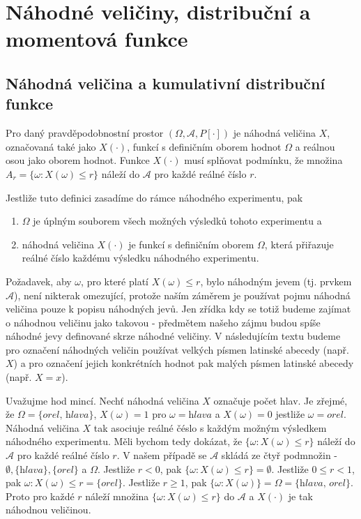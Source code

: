 \chapter{Náhodné veličiny, distribuční a momentová funkce}

\section{Náhodná veličina a kumulativní distribuční funkce}

\begin{definition}
Pro daný pravděpodobnostní prostor $(\Omega, \mathscr{A}, P[\cdot])$ je náhodná veličina $X$, označovaná také jako $X(\cdot)$, funkcí s definičním oborem hodnot $\Omega$ a reálnou osou jako oborem hodnot. Funkce $X(\cdot)$ musí splňovat podmínku, že množina $A_r = \{\omega: X(\omega) \le r\}$ náleží do $\mathscr{A}$ pro každé reálné číslo $r$.
\end{definition}
Jestliže tuto definici zasadíme do rámce náhodného experimentu, pak
\begin{enumerate}
\item $\Omega$ je úplným souborem všech možných výsledků tohoto experimentu a
\item náhodná veličina $X(\cdot)$ je funkcí s definičním oborem $\Omega$, která přiřazuje reálné číslo každému výsledku náhodného experimentu.
\end{enumerate}
Požadavek, aby $\omega$, pro které platí $X(\omega) \le r$, bylo náhodným jevem (tj. prvkem $\mathscr{A}$), není nikterak omezující, protože naším záměrem je používat pojmu náhodná veličina pouze k popisu náhodných jevů. Jen zřídka kdy se totiž budeme zajímat o náhodnou veličinu jako takovou - předmětem našeho zájmu budou spíše náhodné jevy definované skrze náhodné veličiny.
V následujícím textu budeme pro označení náhodných veličin používat velkých písmen latinské abecedy (např. $X$) a pro označení jejich konkrétních hodnot pak malých písmen latinské abecedy (např. $X = x$).

\begin{example}
Uvažujme hod mincí. Nechť náhodná veličina $X$ označuje počet hlav. Je zřejmé, že $\Omega = \{\textit{orel, hlava}\}$, $X(\omega) = 1$ pro $\omega = \textit{hlava}$ a $X(\omega) = 0$ jestliže $\omega = \textit{orel}$. Náhodná veličina $X$ tak asociuje reálné čéslo s každým možným výsledkem náhodného experimentu. Měli bychom tedy dokázat, že $\{\omega: X(\omega) \le r\}$ náleží do $\mathscr{A}$ pro každé reálné číslo $r$. V našem případě se $\mathscr{A}$ skládá ze čtyř podmnožin - $\emptyset, \textit{\{hlava\}}, \textit{\{orel\}}$ a $\Omega$. Jestliže $r < 0$, pak $\{\omega: X(\omega) \le r\} = \emptyset$. Jestliže $0 \le r < 1$, pak ${\omega: X(\omega) \le r} = \textit{\{orel\}}$. Jestliže $r \ge 1$, pak $\{\omega: X(\omega)\} = \Omega = \textit{\{hlava, orel\}}$. Proto pro každé $r$ náleží množina $\{\omega: X(\omega) \le r\}$ do $\mathscr{A}$ a $X(\cdot)$ je tak náhodnou veličinou.
\end{example}

